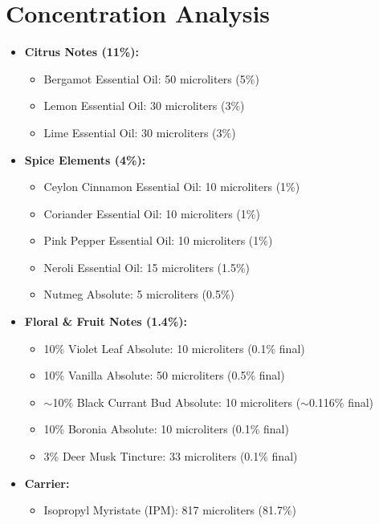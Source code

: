 \documentclass{article}
\begin{document}
\section*{Concentration Analysis}
\begin{itemize}[leftmargin=*]
  \item \textcolor{colaRed}{\textbf{Citrus Notes (11\%):}}
  \begin{itemize}
    \item Bergamot Essential Oil: 50 microliters (5\%)
    \item Lemon Essential Oil: 30 microliters (3\%)
    \item Lime Essential Oil: 30 microliters (3\%)
  \end{itemize}
  
  \item \textcolor{colaRed}{\textbf{Spice Elements (4\%):}}
  \begin{itemize}
    \item Ceylon Cinnamon Essential Oil: 10 microliters (1\%)
    \item Coriander Essential Oil: 10 microliters (1\%)
    \item Pink Pepper Essential Oil: 10 microliters (1\%)
    \item Neroli Essential Oil: 15 microliters (1.5\%)
    \item Nutmeg Absolute: 5 microliters (0.5\%)
  \end{itemize}
  
  \item \textcolor{violetPurple}{\textbf{Floral \& Fruit Notes (1.4\%):}}
  \begin{itemize}
    \item 10\% Violet Leaf Absolute: 10 microliters (0.1\% final)
    \item 10\% Vanilla Absolute: 50 microliters (0.5\% final)
    \item $\sim$10\% Black Currant Bud Absolute: 10 microliters ($\sim$0.116\% final)
    \item 10\% Boronia Absolute: 10 microliters (0.1\% final)
    \item 3\% Deer Musk Tincture: 33 microliters (0.1\% final)
  \end{itemize}
  
  \item \textcolor{colaBrown}{\textbf{Carrier:}}
  \begin{itemize}
    \item Isopropyl Myristate (IPM): 817 microliters (81.7\%)
  \end{itemize}
\end{itemize}
\end{document}
